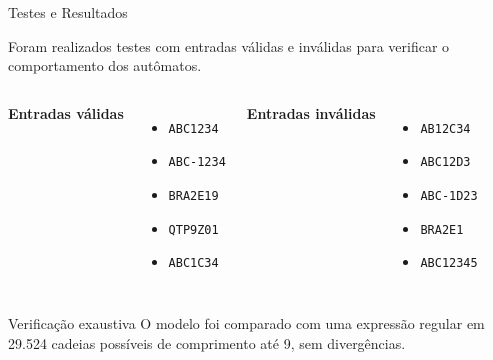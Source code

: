 \documentclass[aspectratio=169,12pt]{beamer}
\begin{document}
\begin{frame}{Testes e Resultados}

    Foram realizados testes com entradas válidas e inválidas
    para verificar o comportamento dos autômatos.

    \vspace{0.3cm}

    \begin{columns}


        \textbf{Entradas válidas}

        \begin{itemize}
            \item \texttt{ABC1234}
            \item \texttt{ABC-1234}
            \item \texttt{BRA2E19}
            \item \texttt{QTP9Z01}
            \item \texttt{ABC1C34}
        \end{itemize}


        \textbf{Entradas inválidas}

        \begin{itemize}
            \item \texttt{AB12C34}
            \item \texttt{ABC12D3}
            \item \texttt{ABC-1D23}
            \item \texttt{BRA2E1}
            \item \texttt{ABC12345}
        \end{itemize}

    \end{columns}

    \vspace{0.3cm}

    \begin{block}{Verificação exaustiva}
        O modelo foi comparado com uma expressão regular
        em 29.524 cadeias possíveis de comprimento até 9,
        sem divergências.
    \end{block}

\end{frame}

\end{document}
